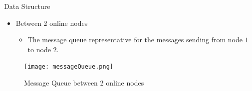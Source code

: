 \documentclass{beamer}
\begin{document}
\begin{frame}{Data Structure}
	\begin{itemize}
		\item Between 2 online nodes
		\begin{itemize}
			\item The message queue representative for the messages sending from node $1$ to node $2$.
		\end{itemize}
	\end{itemize}
	
	\begin{figure}
		\texttt{[image: messageQueue.png]}
		\caption{Message Queue between 2 online nodes}
	\end{figure}
\end{frame}
\end{document}
